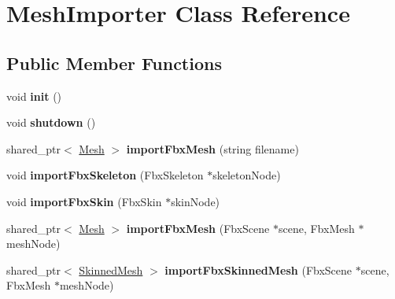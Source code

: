 \hypertarget{class_mesh_importer}{}\section{Mesh\+Importer Class Reference}
\label{class_mesh_importer}
\subsection*{Public Member Functions}
\begin{DoxyCompactItemize}
\item 
\hypertarget{class_mesh_importer_ab2796aabebc5918c76569b3a644713d7}{}void {\bfseries init} ()\label{class_mesh_importer_ab2796aabebc5918c76569b3a644713d7}

\item 
\hypertarget{class_mesh_importer_a22b8d0d5334546680688976059dc6580}{}void {\bfseries shutdown} ()\label{class_mesh_importer_a22b8d0d5334546680688976059dc6580}

\item 
\hypertarget{class_mesh_importer_ad045f72cce53c45688ac84999698204a}{}shared\+\_\+ptr$<$ \hyperlink{class_mesh}{Mesh} $>$ {\bfseries import\+Fbx\+Mesh} (string filename)\label{class_mesh_importer_ad045f72cce53c45688ac84999698204a}

\item 
\hypertarget{class_mesh_importer_a9dc165f78e1b759ee6058eff5968c615}{}void {\bfseries import\+Fbx\+Skeleton} (Fbx\+Skeleton $\ast$skeleton\+Node)\label{class_mesh_importer_a9dc165f78e1b759ee6058eff5968c615}

\item 
\hypertarget{class_mesh_importer_af2231e344407382855918313611fb43e}{}void {\bfseries import\+Fbx\+Skin} (Fbx\+Skin $\ast$skin\+Node)\label{class_mesh_importer_af2231e344407382855918313611fb43e}

\item 
\hypertarget{class_mesh_importer_aaf12107c1df43dce0108802245543f40}{}shared\+\_\+ptr$<$ \hyperlink{class_mesh}{Mesh} $>$ {\bfseries import\+Fbx\+Mesh} (Fbx\+Scene $\ast$scene, Fbx\+Mesh $\ast$mesh\+Node)\label{class_mesh_importer_aaf12107c1df43dce0108802245543f40}

\item 
\hypertarget{class_mesh_importer_aa0acb8ba390c4a30c5c60c97c24c981e}{}shared\+\_\+ptr$<$ \hyperlink{class_skinned_mesh}{Skinned\+Mesh} $>$ {\bfseries import\+Fbx\+Skinned\+Mesh} (Fbx\+Scene $\ast$scene, Fbx\+Mesh $\ast$mesh\+Node)\label{class_mesh_importer_aa0acb8ba390c4a30c5c60c97c24c981e}


\end{DoxyCompactItemize}
